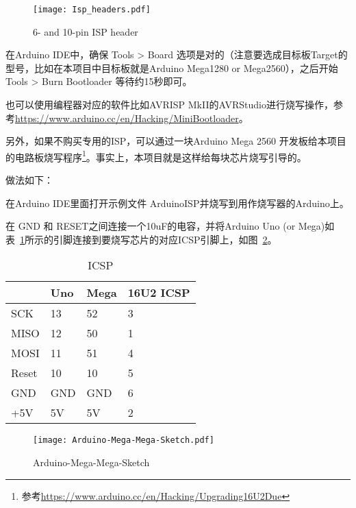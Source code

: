 \begin{figure}[htbp]
    \centering
    \texttt{[image: Isp\_headers.pdf]}
    \caption{6- and 10-pin ISP header}
    \label{fig:Isp_headers}
\end{figure}

在Arduino IDE中，确保 Tools > Board 选项是对的（注意要选成目标板Target的型号，比如在本项目中目标板就是Arduino Mega1280 or Mega2560），之后开始 Tools > Burn Bootloader 等待约15秒即可。

也可以使用编程器对应的软件比如AVRISP MkII的AVRStudio进行烧写操作，参考\url{https://www.arduino.cc/en/Hacking/MiniBootloader}。

另外，如果不购买专用的ISP，可以通过一块Arduino Mega 2560 开发板给本项目的电路板烧写程序\footnote{参考\url{https://www.arduino.cc/en/Hacking/Upgrading16U2Due}}。事实上，本项目就是这样给每块芯片烧写引导的。

做法如下：

在Arduino IDE里面打开示例文件 ArduinoISP并烧写到用作烧写器的Arduino上。

在 GND 和 RESET之间连接一个10uF的电容，并将Arduino Uno (or Mega)如表~\ref{tab:ICSP}所示的引脚连接到要烧写芯片的对应ICSP引脚上，如图~\ref{fig:Arduino-Mega-Mega-Sketch}。

\begin{table}[htbp]
    \centering
    \begin{tabular}{@{}llll@{}}
    \toprule
          & Uno & Mega & 16U2 ICSP \\ \midrule
    SCK   & 13  & 52   & 3         \\
    MISO  & 12  & 50   & 1         \\
    MOSI  & 11  & 51   & 4         \\
    Reset & 10  & 10   & 5         \\
    GND   & GND & GND  & 6         \\
    +5V   & 5V  & 5V   & 2         \\ \bottomrule
    \end{tabular}
    \caption{ICSP}
    \label{tab:ICSP}
\end{table}

\begin{figure}[htbp]
    \centering
    \texttt{[image: Arduino-Mega-Mega-Sketch.pdf]}
    \caption{Arduino-Mega-Mega-Sketch}
    \label{fig:Arduino-Mega-Mega-Sketch}
\end{figure}

